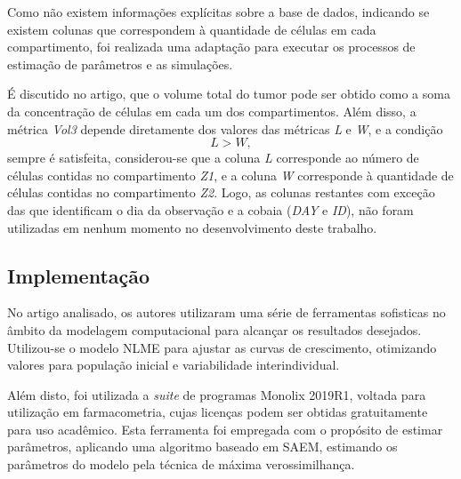 \documentclass[12pt]{article}
\begin{document}

Como não existem informações explícitas sobre a base de dados, indicando se existem colunas que correspondem à quantidade de células em cada compartimento, foi realizada uma adaptação para executar os processos de estimação de parâmetros e as simulações. 

É discutido no artigo, que o volume total do tumor pode ser obtido como a soma da concentração de células em cada um dos compartimentos. Além disso, a métrica \emph{Vol3} depende diretamente dos valores das métricas \emph{L} e \emph{W}, e a condição
\begin{equation*}
    L > W,
\end{equation*}
sempre é satisfeita, considerou-se que a coluna \emph{L} corresponde ao número de células contidas no compartimento \emph{Z1}, e a coluna \emph{W} corresponde à quantidade de células contidas no compartimento \emph{Z2}. Logo, as colunas restantes com exceção das que identificam o dia da observação e a cobaia (\emph{DAY} e \emph{ID}), não foram utilizadas em nenhum momento no desenvolvimento deste trabalho.

\subsection{Implementação}

No artigo analisado, os autores utilizaram uma série de ferramentas sofisticas no âmbito da modelagem computacional para alcançar os resultados desejados. Utilizou-se o modelo NLME\footnotemark \hspace{0.1cm} para ajustar as curvas de crescimento, otimizando valores para população inicial e variabilidade interindividual.


Além disto, foi utilizada a \emph{suite} de programas Monolix 2019R1\footnotemark, voltada para utilização em farmacometria, cujas licenças podem ser obtidas gratuitamente para uso acadêmico. Esta ferramenta foi empregada com o propósito de estimar parâmetros, aplicando uma algoritmo baseado em SAEM\footnotemark, estimando os parâmetros do modelo pela técnica de máxima verossimilhança.

\end{document}
